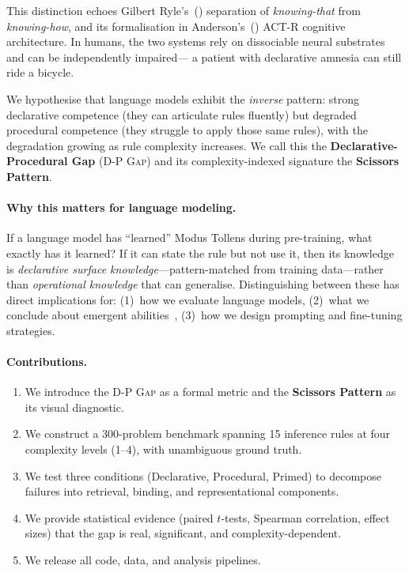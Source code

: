 \documentclass{article}
\newcommand{\dpgap}{\textsc{D-P Gap}}
\begin{document}
This distinction echoes Gilbert Ryle's~(\citeyear{ryle1949})
separation of \emph{knowing-that} from \emph{knowing-how}, and its
formalisation in Anderson's~(\citeyear{anderson1983}) ACT-R cognitive
architecture.
In humans, the two systems rely on dissociable neural substrates
\cite{squire1992declarative} and can be independently impaired---
a patient with declarative amnesia can still ride a bicycle.

We hypothesise that language models exhibit the \emph{inverse}
pattern: strong declarative competence (they can articulate rules
fluently) but degraded procedural competence (they struggle to apply
those same rules), with the degradation growing as rule complexity
increases.
We call this the \textbf{Declarative-Procedural Gap} (\dpgap{}) and
its complexity-indexed signature the \textbf{Scissors Pattern}.

\paragraph{Why this matters for language modeling.}
If a language model has ``learned'' Modus Tollens during pre-training,
what exactly has it learned?
If it can state the rule but not use it, then its knowledge is
\emph{declarative surface knowledge}---pattern-matched from training
data---rather than \emph{operational knowledge} that can generalise.
Distinguishing between these has direct implications for:
(1)~how we evaluate language models,
(2)~what we conclude about emergent
abilities~\cite{schaeffer2023mirage},
(3)~how we design prompting and fine-tuning strategies.

\paragraph{Contributions.}
\begin{enumerate}
    \item We introduce the \dpgap{} as a formal metric and the
    \textbf{Scissors Pattern} as its visual diagnostic.
    \item We construct a 300-problem benchmark spanning 15 inference
    rules at four complexity levels (1--4), with unambiguous ground truth.
    \item We test three conditions (Declarative, Procedural, Primed)
    to decompose failures into retrieval, binding, and
    representational components.
    \item We provide statistical evidence (paired $t$-tests,
    Spearman correlation, effect sizes) that the gap is real,
    significant, and complexity-dependent.
    \item We release all code, data, and analysis pipelines.
\end{enumerate}
\end{document}
